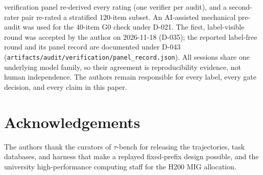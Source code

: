 \documentclass[a4paper,fleqn]{cas-sc}
\begin{document}
\begin{itemize}
  verification panel re-derived every rating (one verifier per audit), and a second-rater pair
  re-rated a stratified 120-item subset. An AI-assisted mechanical pre-audit was used for the
  40-item G0 check under D-021. The first, label-visible round was accepted by the author on
  2026-11-18 (D-035); the reported label-free round and its panel record are documented under
  D-043 (\texttt{artifacts/audit/verification/panel\_record.json}). All sessions share one
  underlying model family, so their agreement is reproducibility evidence, not human
  independence. The authors remain responsible for every label, every gate decision, and every
  claim in this paper.
\end{itemize} \section*{Acknowledgements}
The authors thank the curators of $\tau$-bench for releasing the trajectories, task databases, and
harness that make a replayed fixed-prefix design possible, and the university high-performance
computing staff for the H200 MIG allocation. 
\sloppy
\setlength{\bibsep}{0pt}
\renewcommand{\bibfont}{\fontsize{8.5pt}{9pt}\selectfont}

 \vspace{4pt}
\end{document}
